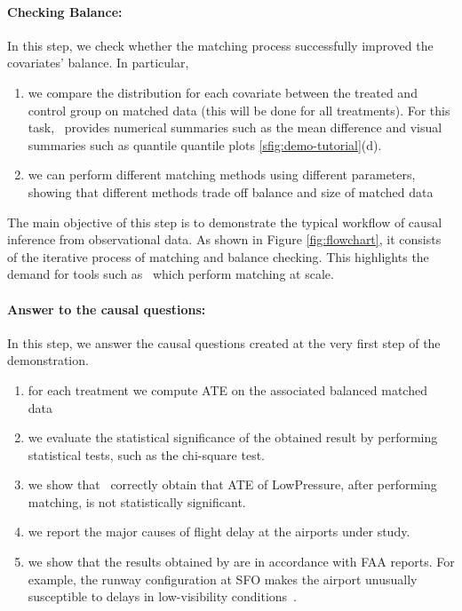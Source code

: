 \paragraph{\bf Checking Balance:}  In this step, we check whether the
matching process  successfully improved the covariates' balance. In particular,
    \begin{enumerate}
      \item  we compare the distribution for each covariate between the treated and control group on matched data (this will be done for all treatments). For this task, \GSQL\  provides numerical summaries such as the mean difference and visual summaries such as quantile quantile plots \ref{sfig:demo-tutorial}(d).

      \item  we can perform different matching methods using different
        parameters, showing that different methods trade off balance and size of matched data%
       \end{enumerate}
      The main objective of this step is to demonstrate the typical workflow of causal inference from observational data. As shown in Figure \ref{fig:flowchart}, it consists of the iterative process of matching and balance checking. This highlights the demand for tools such as \GSQL\, which perform matching at scale.

     \paragraph{\bf Answer to the causal questions:} %
In this step,  we answer the causal questions created at the very first step of the demonstration.
       \begin{enumerate}
       \item for each treatment we compute ATE on the associated balanced matched data
      \item we evaluate the statistical significance of the obtained
        result by performing statistical tests, such as the chi-square test.
      \item we show that \GSQL\ correctly obtain that ATE of
        LowPressure, after performing matching, is not statistically significant.
        \item we report the major causes of flight delay at the airports under study.
    \item   we show that the results obtained by \GSQL are in accordance with
FAA reports. %
For example, the runway configuration at SFO makes the airport
unusually susceptible to delays in low-visibility conditions~\cite{faa-sfo}.

        \end{enumerate}



